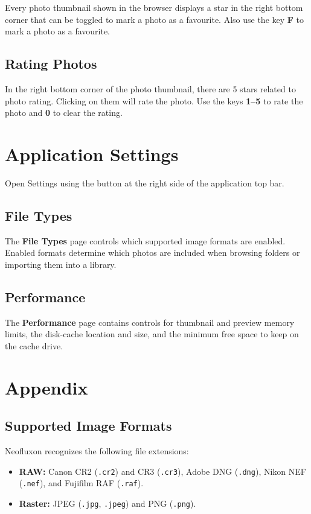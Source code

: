 \documentclass[11pt]{article}
\begin{document}
Every photo thumbnail shown in the browser displays a star in the right bottom
corner that can be toggled to mark a photo as a favourite.
Also use the key \textbf{F} to mark a photo as a favourite.

\subsection{Rating Photos}

In the right bottom corner of the photo thumbnail, there are 5 stars related
to photo rating. Clicking on them will rate the photo. Use the
keys \textbf{1--5} to rate the photo and \textbf{0} to clear the rating.

\section{Application Settings}

Open Settings using the button at the right side of the application top bar.

\subsection{File Types}

The \textbf{File Types} page controls which supported image formats are
enabled. Enabled formats determine which photos are included when browsing
folders or importing them into a library.

\subsection{Performance}

The \textbf{Performance} page contains controls for thumbnail and preview
memory limits, the disk-cache location and size, and the minimum free space
to keep on the cache drive.

\section{Appendix}

\subsection{Supported Image Formats}

Neofluxon recognizes the following file extensions:
\begin{itemize}
  \item \textbf{RAW:} Canon CR2 (\texttt{.cr2}) and CR3 (\texttt{.cr3}),
        Adobe DNG (\texttt{.dng}), Nikon NEF (\texttt{.nef}), and Fujifilm
        RAF (\texttt{.raf}).
  \item \textbf{Raster:} JPEG (\texttt{.jpg}, \texttt{.jpeg}) and PNG
        (\texttt{.png}).
\end{itemize}
\end{document}
